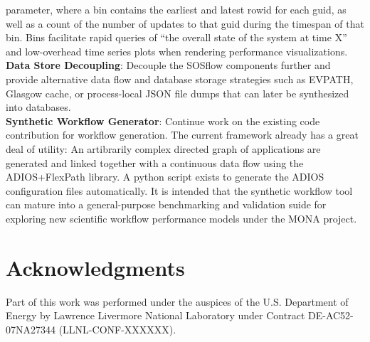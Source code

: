 parameter, where a bin contains the earliest and latest rowid for each
guid, as well as a count of the number of updates to that guid during
the timespan of that bin.
%
Bins facilitate rapid queries of ``the overall state of the system at
time X'' and low-overhead time series plots when rendering performance
visualizations.
\\
\textbf{Data Store Decoupling}: Decouple the SOSflow components further
and provide alternative data flow and database storage strategies such
as EVPATH, Glasgow cache, or process-local JSON file dumps that can
later be synthesized into databases.
\\
\textbf{Synthetic Workflow Generator}: Continue work on the existing
code contribution for workflow generation.
%
The current framework already has a great deal of utility: An
artibrarily complex directed graph of applications are generated and
linked together with a continuous data flow using the ADIOS+FlexPath
library.
%
A python script exists to generate the ADIOS configuration files
automatically.
%
It is intended that the synthetic workflow tool can mature into a
general-purpose benchmarking and validation suide for exploring new
scientific workflow performance models under the MONA project.




\section{Acknowledgments}
Part of this work was performed under the auspices of the
U.S. Department of Energy by Lawrence Livermore National Laboratory
under Contract DE-AC52-07NA27344 (LLNL-CONF-XXXXXX).




